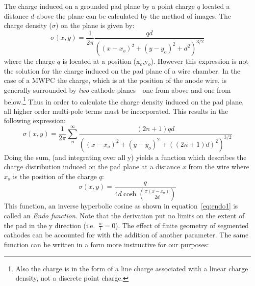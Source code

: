 \documentclass{article}
\begin{document}
The charge induced on a grounded pad plane by a point charge $q$ located
a distance $d$ above the plane can be calculated by the method of
images.  The charge density ($\sigma$) on the plane is given by:
\begin{equation}
  \sigma (x,y) = \frac{1}{2 \pi} \frac{q d}{((x-x_{o})^{2} + (y-y_{o})^{2} + d^{2})^{3/2}}
\label{eq:imageQ}
\end{equation}
where the charge $q$ is located at a position (x$_{o}$,y$_{o}$).  However
this expression is not the solution for the charge induced on the pad
plane of a wire chamber.  In the case of a MWPC the charge, which
is at the position of the anode wire, is generally surrounded by {\em two}
cathode planes---one from
above and one from below.\footnote{Also the charge is in the form of
  a line charge associated with a linear charge density, not a
  discrete point charge.}
Thus in order to calculate the charge density induced on the pad
plane, all higher order multi-pole terms must be incorporated.
This results in the following expression:
\begin{equation}
\sigma (x,y) = \frac{1}{2 \pi} \sum_{n}^{\infty} \frac{(2n+1) q d}{((x-x_{o})^{2} + (y-y_{o})^{2} + ((2n+1) d)^{2})^{3/2}}
\label{eq:imageQ2}
\end{equation}
Doing the sum, (and integrating over all y) yields a function
which describes the charge distribution induced on the
pad plane at a distance $x$ from the wire where $x_{o}$ is
the position of the charge $q$:
\begin{equation}
\sigma(x,y) = \frac{q}{4 d \cosh(\frac{\pi (x- x_{o})}{2 d})}
\label{eq:endo1}
\end{equation}
This function, an inverse hyperbolic cosine as shown in
equation~\ref{eq:endo1} is called an {\em Endo function}.  Note that the
derivation put no limits on the extent of the pad in the y direction
(i.e.~$\frac{w}{l}=0$).
The effect of finite geometry of segmented cathodes can be accounted
for with the addition of another parameter.  The same function can
be written in a form more instructive for our purposes:
\end{document}
